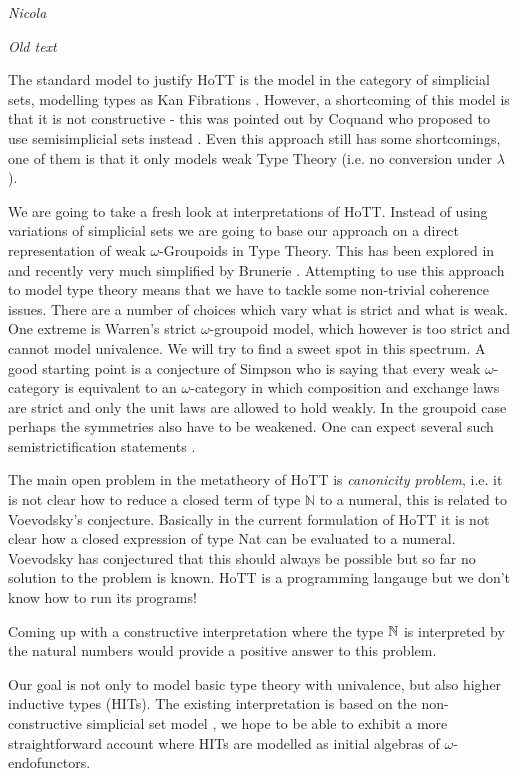 \documentclass[twocolumn,a4paper,11pt]{article}
\begin{document}
\emph{Nicola}

\emph{Old text}

The standard model to justify HoTT is the model in the category of
simplicial sets, modelling types as Kan Fibrations
\cite{voevodskyEtAl}. However, a shortcoming of this model is that it
is not constructive - this was pointed out by Coquand who proposed to
use semisimplicial sets instead \cite{CoquandEtAl}. Even this approach
still has some shortcomings, one of them is that it only models weak
Type Theory (i.e. no conversion under $\lambda$).

We are going to take a fresh look at interpretations of HoTT. Instead
of using variations of simplicial sets we are going to base our
approach on a direct representation of weak $\omega$-Groupoids in Type
Theory. This has been explored in \cite{altiRypacek} and recently very
much simplified by Brunerie \cite{guillaume:gpds}. Attempting to use
this approach to model type theory means that we have to tackle some
non-trivial coherence issues. There are a number of choices which vary
what is strict and what is weak. One extreme is Warren's strict
$\omega$-groupoid model, which however is too strict and cannot model
univalence. We will try to find a sweet spot in this spectrum.  A good
starting point is a conjecture of Simpson \cite{simpson} who is saying
that every weak $\omega$-category is equivalent to an
$\omega$-category in which composition and exchange laws are strict
and only the unit laws are allowed to hold weakly. In the groupoid
case perhaps the symmetries also have to be weakened. One can expect
several such semistrictification statements \cite{ChengGurski}. 


The main open problem in the metatheory of HoTT is \emph{canonicity
  problem}, i.e. it is not clear how to reduce a closed term of type
$\mathbb{N}$ to a numeral, this is related to Voevodsky's conjecture.  Basically in the current
formulation of HoTT it is not clear how a closed expression of type
Nat can be evaluated to a numeral. Voevodsky has conjectured that this
should always be possible but so far no solution to the problem is
known. HoTT is a programming langauge but we don't know how
to run its programs!

Coming up with a constructive interpretation where the type $\Bbb{N}$ 
is interpreted by the natural numbers would provide a positive answer
to this problem.

Our goal is not only to model basic type theory with univalence, but
also higher inductive types (HITs). The existing interpretation is
based on the non-constructive simplicial set model \cite{shulman}, we
hope to be able to exhibit a more straightforward account where HITs
are modelled as initial algebras of $\omega$-endofunctors.
\end{document}
